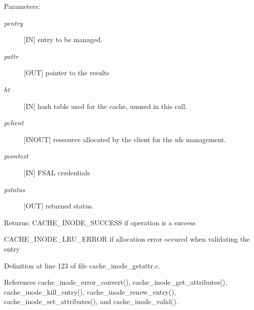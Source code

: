 \begin{Desc}
\item[Parameters:]
\begin{description}
\item[{\em pentry}][IN] entry to be managed. \item[{\em pattr}][OUT] pointer to the results \item[{\em ht}][IN] hash table used for the cache, unused in this call. \item[{\em pclient}][INOUT] ressource allocated by the client for the nfs management. \item[{\em pcontext}][IN] FSAL credentials \item[{\em pstatus}][OUT] returned status.\end{description}
\end{Desc}
\begin{Desc}
\item[Returns:]CACHE\_\-INODE\_\-SUCCESS if operation is a success \par
 

CACHE\_\-INODE\_\-LRU\_\-ERROR if allocation error occured when validating the entry \end{Desc}


Definition at line 123 of file cache\_\-inode\_\-getattr.c.

References cache\_\-inode\_\-error\_\-convert(), cache\_\-inode\_\-get\_\-attributes(), cache\_\-inode\_\-kill\_\-entry(), cache\_\-inode\_\-renew\_\-entry(), cache\_\-inode\_\-set\_\-attributes(), and cache\_\-inode\_\-valid().